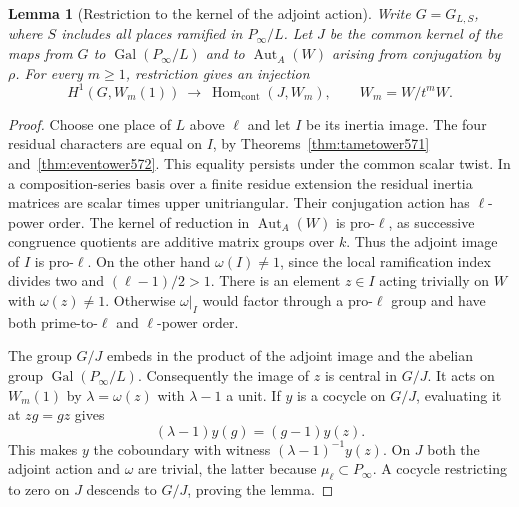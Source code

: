 \documentclass[a4paper,11pt]{article}
\newtheorem{lemma}[proposition]{Lemma}
\theoremstyle{definition}
\theoremstyle{remark}
\numberwithin{equation}{section}
\begin{document}
\begin{lemma}[Restriction to the kernel of the adjoint action]
\leavevmode\label{lem:projectivekernel599}
Write \(G=G_{L,S}\), where \(S\) includes all places
ramified in \(P_\infty/L\). Let \(J\) be the common kernel
of the maps from \(G\) to \(\operatorname{Gal}(P_\infty/L)\)
and to \(\operatorname{Aut}_A(W)\) arising from conjugation
by \(\rho\). For every \(m\ge1\), restriction gives an
injection
\[
 H^1(G,W_m(1))\ \longrightarrow\
          \operatorname{Hom}_{\mathrm{cont}}(J,W_m),
 \qquad W_m=W/t^mW .
\]
\end{lemma}
\begin{proof}
Choose one place of \(L\) above \(\ell\) and let \(I\)
be its inertia image. The four residual characters are
equal on \(I\), by Theorems~\ref{thm:tametower571}
and~\ref{thm:eventower572}. This equality persists under
the common scalar twist. In a composition-series basis
over a finite residue extension the residual inertia
matrices are scalar times upper unitriangular. Their
conjugation action has \(\ell\)-power order. The kernel
of reduction in \(\operatorname{Aut}_A(W)\) is pro-\(\ell\),
as successive congruence quotients are additive matrix
groups over \(k\). Thus the adjoint image of \(I\) is
pro-\(\ell\). On the other hand \(\omega(I)\ne1\), since
the local ramification index divides two and
\((\ell-1)/2>1\). There is an element \(z\in I\) acting
trivially on \(W\) with \(\omega(z)\ne1\). Otherwise
\(\omega|_I\) would factor through a pro-\(\ell\) group
and have both prime-to-\(\ell\) and \(\ell\)-power order.

The group \(G/J\) embeds in the product of the adjoint
image and the abelian group \(\operatorname{Gal}(P_\infty/L)\).
Consequently the image of \(z\) is central in \(G/J\).
It acts on \(W_m(1)\) by \(\lambda=\omega(z)\) with
\(\lambda-1\) a unit. If \(y\) is a cocycle on \(G/J\),
evaluating it at \(zg=gz\) gives
\[
                 (\lambda-1)y(g)=(g-1)y(z).
\]
This makes \(y\) the coboundary with witness
\((\lambda-1)^{-1}y(z)\). On \(J\) both the adjoint
action and \(\omega\) are trivial, the latter because
\(\mu_\ell\subset P_\infty\). A cocycle restricting to
zero on \(J\) descends to \(G/J\), proving the lemma.
\end{proof}
\end{document}
